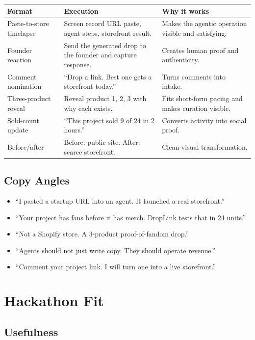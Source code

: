 \documentclass[11pt]{article}
\begin{document}
\begin{longtable}{p{}p{}p{}}
\toprule
\textbf{Format} & \textbf{Execution} & \textbf{Why it works} \\
\midrule
\endhead
Paste-to-store timelapse & Screen record URL paste, agent steps, storefront result. & Makes the agentic operation visible and satisfying. \\
Founder reaction & Send the generated drop to the founder and capture response. & Creates human proof and authenticity. \\
Comment nomination & ``Drop a link. Best one gets a storefront today.'' & Turns comments into intake. \\
Three-product reveal & Reveal product 1, 2, 3 with why each exists. & Fits short-form pacing and makes curation visible. \\
Sold-count update & ``This project sold 9 of 24 in 2 hours.'' & Converts activity into social proof. \\
Before/after & Before: public site. After: scarce storefront. & Clean visual transformation. \\
\bottomrule
\end{longtable}

\subsection{Copy Angles}

\begin{itemize}
  \item ``I pasted a startup URL into an agent. It launched a real storefront.''
  \item ``Your project has fans before it has merch. DropLink tests that in 24 units.''
  \item ``Not a Shopify store. A 3-product proof-of-fandom drop.''
  \item ``Agents should not just write copy. They should operate revenue.''
  \item ``Comment your project link. I will turn one into a live storefront.''
\end{itemize}

\section{Hackathon Fit}

\subsection{Usefulness}
\end{document}

